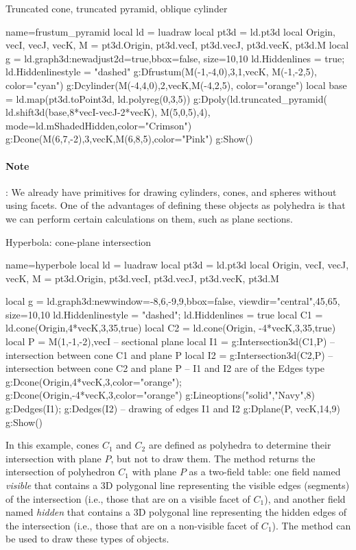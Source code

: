 \begin{demo}{Truncated cone, truncated pyramid, oblique cylinder}
\begin{luadraw}{name=frustum_pyramid}
local ld = luadraw
local pt3d = ld.pt3d
local Origin, vecI, vecJ, vecK, M = pt3d.Origin, pt3d.vecI, pt3d.vecJ, pt3d.vecK, pt3d.M
local g = ld.graph3d:new{adjust2d=true,bbox=false, size={10,10} }
ld.Hiddenlines = true; ld.Hiddenlinestyle = "dashed"
g:Dfrustum(M(-1,-4,0),3,1,vecK, M(-1,-2,5), {color="cyan"})
g:Dcylinder(M(-4,4,0),2,vecK,M(-4,2,5), {color="orange"})
local base = ld.map(pt3d.toPoint3d, ld.polyreg(0,3,5))
g:Dpoly(ld.truncated_pyramid( ld.shift3d(base,8*vecI-vecJ-2*vecK), M(5,0,5),4),
    {mode=ld.mShadedHidden,color="Crimson"})
g:Dcone(M(6,7,-2),3,vecK,M(6,8,5),{color="Pink"})
g:Show()
\end{luadraw}
\end{demo}

\paragraph{Note}: We already have primitives for drawing cylinders, cones, and spheres without using facets. One of the advantages of defining these objects as polyhedra is that we can perform certain calculations on them, such as plane sections.

\begin{demo}{Hyperbola: cone-plane intersection}
\begin{luadraw}{name=hyperbole}
local ld = luadraw
local pt3d = ld.pt3d
local Origin, vecI, vecJ, vecK, M = pt3d.Origin, pt3d.vecI, pt3d.vecJ, pt3d.vecK, pt3d.M

local g = ld.graph3d:new{window={-8,6,-9,9},bbox=false, 
    viewdir={"central",45,65}, size={10,10}}
ld.Hiddenlinestyle = "dashed"; ld.Hiddenlines = true
local C1 = ld.cone(Origin,4*vecK,3,35,true)
local C2 = ld.cone(Origin, -4*vecK,3,35,true)
local P = {M(1,-1,-2),vecI} -- sectional plane
local I1 = g:Intersection3d(C1,P) -- intersection between cone C1 and plane P
local I2 = g:Intersection3d(C2,P) -- intersection between cone C2 and plane P
-- I1 and I2 are of the Edges type
g:Dcone(Origin,4*vecK,3,{color="orange"}); g:Dcone(Origin,-4*vecK,3,{color="orange"})
g:Lineoptions("solid","Navy",8)
g:Dedges(I1); g:Dedges(I2) -- drawing of edges I1 and I2
g:Dplane(P, vecK,14,9)
g:Show()
\end{luadraw}
\end{demo}

In this example, cones $C_1$ and $C_2$ are defined as polyhedra to determine their intersection with plane $P$, but not to draw them. The method  returns the intersection of polyhedron $C_1$ with plane $P$ as a two-field table: one field named \emph{visible} that contains a 3D polygonal line representing the visible edges (segments) of the intersection (i.e., those that are on a visible facet of $C_1$), and another field named \emph{hidden} that contains a 3D polygonal line representing the hidden edges of the intersection (i.e., those that are on a non-visible facet of $C_1$). The method  can be used to draw these types of objects.

